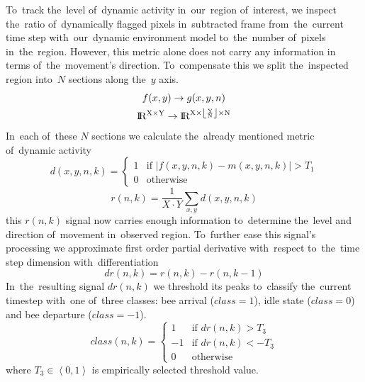To~track the~level of~dynamic activity in~our~region of~interest, we inspect the~ratio of~dynamically flagged pixels in~subtracted frame from~the~current time step with~our~dynamic environment model to~the~number of~pixels in~the~region. However, this metric alone does not carry any information in terms of~the~movement's direction. To~compensate this we split the~inspected region into~$N$ sections along the~$y$ axis.
\begin{equation}
    \begin{gathered}
        f(x,y) \rightarrow g(x,y,n) \\
        \rm I\!R^{X\times Y} \rightarrow \rm I\!R^{X\times \left\lfloor \frac{Y}{N}\right\rfloor  \times N}
    \end{gathered}
\end{equation}
In~each of~these $N$ sections we calculate the~already mentioned metric of~dynamic activity
\begin{equation}
    d(x,y,n,k) = 
    \begin{cases}
        1  & \text{if } \left\lvert f(x,y,n,k) - m(x,y,n,k) \right\rvert > T_1 \\
        0  & \text{otherwise}
    \end{cases}
\end{equation}
\begin{equation}
    r(n, k) = \frac{1}{X \cdot Y} \sum _{x,y} d(x,y,n,k)
\end{equation}
this $r(n,k)$ signal now carries enough information to~determine the~level and direction of~movement in~observed region. To~further ease this signal's processing we approximate first order partial derivative with~respect to~the~time step dimension with~differentiation
\begin{equation}
    dr(n, k) = r(n, k) - r(n, k-1)
\end{equation}
In~the~resulting signal $dr(n, k)$ we threshold its peaks to~classify the~current timestep with~one of~three classes: bee arrival ($class = 1$), idle state ($class = 0$) and bee departure ($class = -1$).
\begin{equation}
    class(n, k) = 
    \begin{cases}
        1  & \text{if } dr(n, k) > T_3 \\
        -1  & \text{if } dr(n, k) < -T_3 \\
        0  & \text{otherwise}
    \end{cases}
\end{equation}
where $T_3 \in \left\langle 0, 1\right\rangle $ is empirically selected threshold value.

